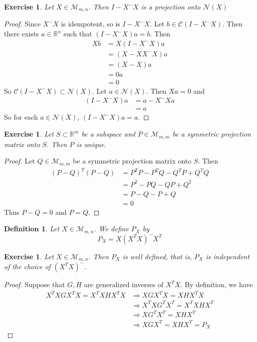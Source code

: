 \documentclass[12pt]{amsart}
\newtheorem{defn}[thm]{Definition}
\newtheorem{ex}[thm]{Exercise}
\newcommand{\R}{\mathbb{R}}
\newcommand{\MC}{\mathcal{C}}
\newcommand{\MN}{\mathcal{N}}
\newcommand{\MM}{\mathcal{M}}
\newcommand{\z}[1]{Let ${#1} \in \MM_{m,n}$}
\begin{document}
\begin{ex}
\z{X}. Then $I-X^-X$ is a projection onto $\MN(X)$
\end{ex}

\begin{proof}
Since $X^-X$ is idempotent, so is $I-X^-X$. Let $b \in \MC(I-X^-X)$. Then there exists $a \in \R^n$ such that $(I-X^-X)a = b$. Then 
\begin{align*}
Xb 
&= X(I-X^-X)a \\
&= (X-XX^-X)a \\
&= (X-X)a \\
&= 0a \\ 
&= 0
\end{align*}
So $\MC(I-X^-X) \subset \MN(X)$. Let $a \in \MN(X)$. Then $Xa =0$ and 
\begin{align*}
(I-X^-X)a 
&= a - X^-Xa \\
&= a
\end{align*} 
So for each $a \in \MN(X)$, $(I-X^-X)a = a$.
\end{proof}

\begin{ex}
Let $S \subset \R^m$ be a subspace and $P \in \MM_{m,m}$ be a symmetric projection matrix onto $S$. Then $P$ is unique. 
\end{ex}

\begin{proof}
Let $Q \in \MM_{m,m}$ be a symmetric projection matrix onto $S$. Then 
\begin{align*}
(P-Q)^T(P-Q) 
&= P^TP - P^TQ - Q^TP + Q^TQ \\
&= P^2 - PQ - QP +Q^2 \\
&= P - Q - P + Q \\
&= 0
\end{align*}
Thus $P-Q = 0$ and $P =Q$.
\end{proof}

\begin{defn}
\z{X}. We define $P_X$ by $$P_X = X (X^TX)^-X^T$$
\end{defn}

\begin{ex}
\z{X}. Then $P_X$ is well defined, that is, $P_X$ is independent of the choice of $(X^TX)^-$.
\end{ex}

\begin{proof}
Suppose that $G, H$ are generalized inverses of $X^TX$. By definition, we have 
\begin{align*}
X^TXGX^TX = X^TXHX^TX 
& \Rightarrow XGX^TX = XHX^TX \\
& \Rightarrow X^TXG^TX^T = X^TXHX^T \\
& \Rightarrow XG^TX^T = XHX^T \\
& \Rightarrow XGX^T = XHX^T = P_X
\end{align*}
\end{proof}
\end{document}
